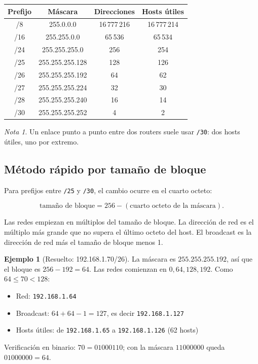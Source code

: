 \documentclass[11pt,a4paper]{article}
\theoremstyle{definition}
\newtheorem{ejemplo}{Ejemplo}[section]
\theoremstyle{remark}
\newtheorem{nota}{Nota}[section]
\begin{document}
\begin{center}
\begin{tabular}{@{}cccc@{}}
\toprule
\textbf{Prefijo} & \textbf{Máscara} & \textbf{Direcciones} & \textbf{Hosts útiles}\\
\midrule
/8  & 255.0.0.0       & 16\,777\,216 & 16\,777\,214\\
/16 & 255.255.0.0     & 65\,536      & 65\,534\\
/24 & 255.255.255.0   & 256 & 254\\
/25 & 255.255.255.128 & 128 & 126\\
/26 & 255.255.255.192 & 64  & 62\\
/27 & 255.255.255.224 & 32  & 30\\
/28 & 255.255.255.240 & 16  & 14\\
/30 & 255.255.255.252 & 4   & 2\\
\bottomrule
\end{tabular}
\end{center}

\begin{nota}
Un enlace punto a punto entre dos routers suele usar \texttt{/30}: dos hosts útiles, uno por extremo.
\end{nota}

\subsection{Método rápido por tamaño de bloque}

Para prefijos entre \texttt{/25} y \texttt{/30}, el cambio ocurre en el cuarto octeto:

\[
\text{tamaño de bloque} = 256 - (\text{cuarto octeto de la máscara}).
\]

Las redes empiezan en múltiplos del tamaño de bloque. La dirección de red es el múltiplo más grande que no supera el último octeto del host. El broadcast es la dirección de red más el tamaño de bloque menos 1.

\begin{ejemplo}[Resuelto: 192.168.1.70/26]
La máscara es $255.255.255.192$, así que el bloque es $256-192=64$. Las redes comienzan en $0, 64, 128, 192$. Como $64 \le 70 < 128$:
\begin{itemize}
  \item Red: \texttt{192.168.1.64}
  \item Broadcast: $64+64-1=127$, es decir \texttt{192.168.1.127}
  \item Hosts útiles: de \texttt{192.168.1.65} a \texttt{192.168.1.126} (62 hosts)
\end{itemize}
Verificación en binario: $70 = 01000110$; con la máscara $11000000$ queda $01000000 = 64$.
\end{ejemplo}
\end{document}
